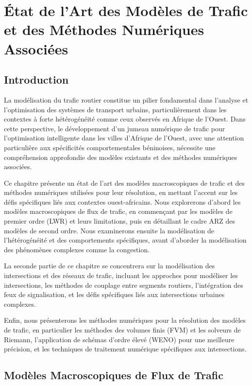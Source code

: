 \chapter{État de l'Art des Modèles de Trafic et des Méthodes Numériques Associées}
\label{chap:etat_art_modeles}

\section{Introduction}
La modélisation du trafic routier constitue un pilier fondamental dans l'analyse et l'optimisation des systèmes de transport urbains, particulièrement dans les contextes à forte hétérogénéité comme ceux observés en Afrique de l'Ouest. Dans cette perspective, le développement d'un jumeau numérique de trafic pour l'optimisation intelligente dans les villes d'Afrique de l'Ouest, avec une attention particulière aux spécificités comportementales béninoises, nécessite une compréhension approfondie des modèles existants et des méthodes numériques associées.

Ce chapitre présente un état de l'art des modèles macroscopiques de trafic et des méthodes numériques utilisées pour leur résolution, en mettant l'accent sur les défis spécifiques liés aux contextes ouest-africains. Nous explorerons d'abord les modèles macroscopiques de flux de trafic, en commençant par les modèles de premier ordre (LWR) et leurs limitations, puis en détaillant le cadre ARZ des modèles de second ordre. Nous examinerons ensuite la modélisation de l'hétérogénéité et des comportements spécifiques, avant d'aborder la modélisation des phénomènes complexes comme la congestion.

La seconde partie de ce chapitre se concentrera sur la modélisation des intersections et des réseaux de trafic, incluant les approches pour modéliser les intersections, les méthodes de couplage entre segments routiers, l'intégration des feux de signalisation, et les défis spécifiques liés aux intersections urbaines complexes.

Enfin, nous présenterons les méthodes numériques pour la résolution des modèles de trafic, en particulier les méthodes des volumes finis (FVM) et les solveurs de Riemann, l'application de schémas d'ordre élevé (WENO) pour une meilleure précision, et les techniques de traitement numérique spécifiques aux intersections.

\section{Modèles Macroscopiques de Flux de Trafic}
